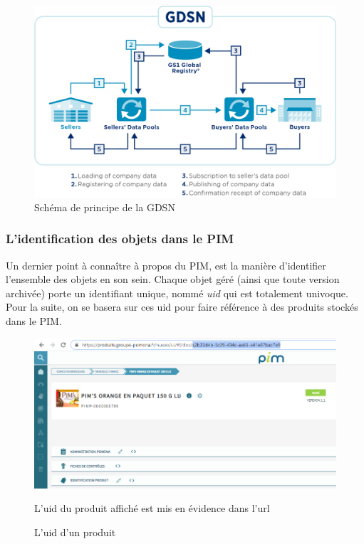                 \begin{figure}[htpb]
                    \begin{center}
                    \includegraphics[width=\linewidth]{img/gdsn-schema.png}
                    \end{center}
                    \caption{Schéma de principe de la GDSN}
                    \label{fig:GDSN}
                \end{figure}                 
                
                \subsubsection{L'identification des objets dans le PIM}

                Un dernier point à connaître à propos du PIM, est la manière d'identifier l'ensemble des objets en son sein.
                Chaque objet géré (ainsi que toute version archivée) porte un identifiant unique, nommé \emph{uid} qui est totalement univoque.
                Pour la suite, on se basera sur ces uid pour faire référence à des produits stockés dans le PIM.

                \begin{figure}[htpb]
                    \begin{center}
                    \includegraphics[width=\linewidth]{img/uid.png}
                    \end{center}
                    L'uid du produit affiché est mis en évidence dans l'url
                    \caption{L'uid d'un produit}
                    \label{fig:uid}
                \end{figure}                 

